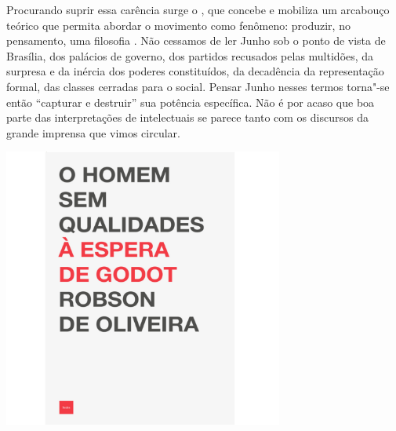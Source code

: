 Procurando suprir essa carência surge o {}, que concebe e mobiliza um arcabouço teórico que permita abordar o movimento {} como fenômeno: produzir, no pensamento, uma filosofia {}. Não cessamos de ler Junho sob o ponto de vista de Brasília, dos palácios de governo, dos partidos recusados pelas multidões, da surpresa e da inércia dos poderes constituídos, da decadência da representação formal, das classes cerradas para o social. Pensar Junho nesses termos torna"-se então “capturar e destruir” sua potência específica. Não é por acaso que boa parte das interpretações de intelectuais se parece tanto com os discursos da grande imprensa que vimos circular.

\vfill

\hspace*{-.4cm}\begin{minipage}[c]{.5\linewidth}
\small{
{}}
\end{minipage}

\pagebreak

\hspace{.5cm}

\begin{center}
\hspace*{-2.5cm}
\hspace*{2.5cm}\includegraphics[width=92mm]{./grid/robson.jpg}
\end{center}

